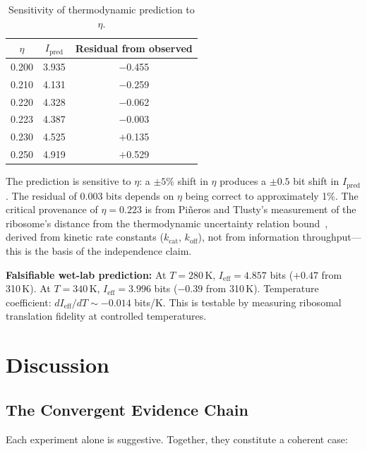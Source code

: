 \documentclass[12pt,a4paper]{article}
\begin{document}
\begin{table}[ht]
\centering
\caption{Sensitivity of thermodynamic prediction to $\eta$.}
\begin{tabular}{ccc}
\toprule
$\eta$ & $I_{\mathrm{pred}}$ & Residual from observed \\
\midrule
0.200 & 3.935 & $-$0.455 \\
0.210 & 4.131 & $-$0.259 \\
0.220 & 4.328 & $-$0.062 \\
0.223 & 4.387 & $-$0.003 \\
0.230 & 4.525 & $+$0.135 \\
0.250 & 4.919 & $+$0.529 \\
\bottomrule
\end{tabular}
\label{tab:sensitivity}
\end{table}

The prediction is sensitive to $\eta$: a $\pm 5$\% shift in $\eta$ produces a $\pm 0.5$ bit shift in $I_{\mathrm{pred}}$. The residual of 0.003 bits depends on $\eta$ being correct to approximately 1\%. The critical provenance of $\eta = 0.223$ is from Pi\~neros and Tlusty's measurement of the ribosome's distance from the thermodynamic uncertainty relation bound~\cite{pineros2020}, derived from kinetic rate constants ($k_{\mathrm{cat}}$, $k_{\mathrm{off}}$), not from information throughput---this is the basis of the independence claim.

\textbf{Falsifiable wet-lab prediction:} At $T = 280$\,K, $I_{\mathrm{eff}} = 4.857$ bits ($+0.47$ from 310\,K). At $T = 340$\,K, $I_{\mathrm{eff}} = 3.996$ bits ($-0.39$ from 310\,K). Temperature coefficient: $dI_{\mathrm{eff}}/dT \sim -0.014$ bits/K. This is testable by measuring ribosomal translation fidelity at controlled temperatures.

\section{Discussion}

\subsection{The Convergent Evidence Chain}

Each experiment alone is suggestive. Together, they constitute a coherent case:
\end{document}

